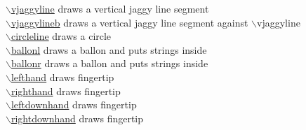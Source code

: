 \documentclass[papersize,a4paper,12pt]{article}
\newcommand{\bs}{$\backslash$}
\begin{document}
\begin{tabbing}
\hyperlink{vjaggyline}{\bs vjaggyline} \> draws a vertical jaggy line segment\\
\hyperlink{vjaggylineb}{\bs vjaggylineb} \> draws a vertical jaggy line segment against \bs vjaggyline\\
\hyperlink{circleline}{\bs circleline} \> draws a circle\\
\hyperlink{ballonr}{\bs ballonl} \> draws a ballon and puts strings inside\\
\hyperlink{ballonr}{\bs ballonr} \> draws a ballon and puts strings inside\\
\hyperlink{lefthand}{\bs lefthand} \> draws fingertip\\
\hyperlink{righthand}{\bs righthand} \> draws fingertip\\
\hyperlink{leftdownhand}{\bs leftdownhand} \> draws fingertip\\
\hyperlink{rightdownhand}{\bs rightdownhand} \> draws fingertip\\

\end{tabbing}
\end{document}
